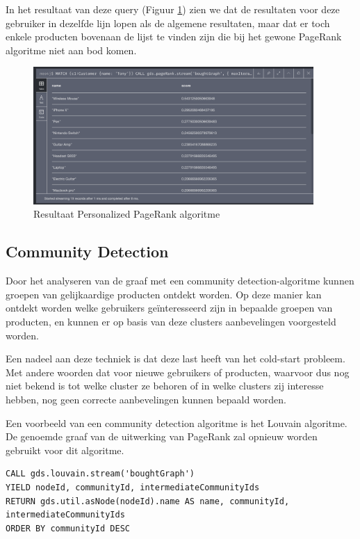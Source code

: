 In het resultaat van deze query (Figuur \ref{fig:personalizedPageRankResult}) zien we dat de resultaten voor deze gebruiker in dezelfde lijn lopen als de algemene resultaten, maar dat er toch enkele producten bovenaan de lijst te vinden zijn die bij het gewone PageRank algoritme niet aan bod komen.

\begin{figure} [ht]
	\centering
	\includegraphics[width=0.95\textwidth]{img/persPageRank_res_1}
	\caption{Resultaat Personalized PageRank algoritme}
	\label{fig:personalizedPageRankResult}
\end{figure}

\newpage
\subsection{Community Detection}
\label{subsec: Community Detection}

Door het analyseren van de graaf met een community detection-algoritme kunnen groepen van gelijkaardige producten ontdekt worden. Op deze manier kan ontdekt worden welke gebruikers geïnteresseerd zijn in bepaalde groepen van producten, en kunnen er op basis van deze clusters aanbevelingen voorgesteld worden. 

Een nadeel aan deze techniek is dat deze last heeft van het cold-start probleem. Met andere woorden dat voor nieuwe gebruikers of producten, waarvoor dus nog niet bekend is tot welke cluster ze behoren of in welke clusters zij interesse hebben, nog geen correcte aanbevelingen kunnen bepaald worden.

Een voorbeeld van een community detection algoritme is het Louvain algoritme. De genoemde graaf van de uitwerking van PageRank zal opnieuw worden gebruikt voor dit algoritme.

\begin{lstlisting}[caption={ Louvain algoritme }]
CALL gds.louvain.stream('boughtGraph')
YIELD nodeId, communityId, intermediateCommunityIds
RETURN gds.util.asNode(nodeId).name AS name, communityId, intermediateCommunityIds
ORDER BY communityId DESC
\end{lstlisting}

